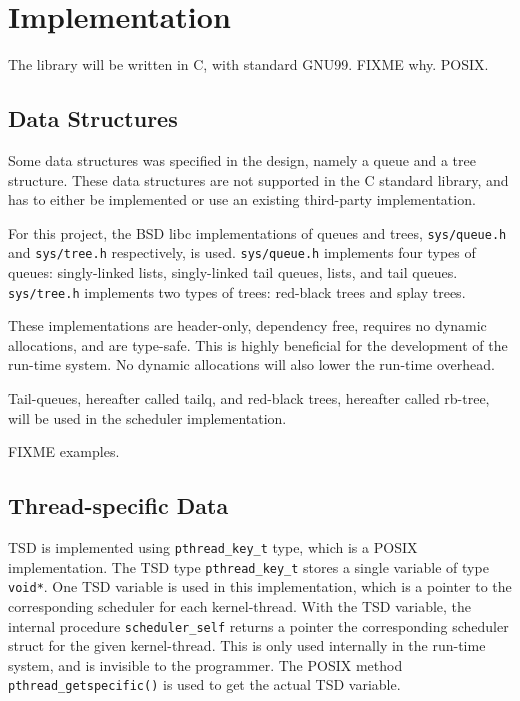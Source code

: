 
\chapter{Implementation}
\label{ch:implementation}

The library will be written in C, with standard GNU99. FIXME why. POSIX.


\section{Data Structures}

Some data structures was specified in the design, namely a queue and a tree structure. These data structures are not supported in the C standard library, and has to either be implemented or use an existing third\hyp{}party implementation.

For this project, the BSD libc implementations of queues and trees, \texttt{sys/queue.h} \citep{manqueue} and \texttt{sys/tree.h} \citep{mantree} respectively, is used. \texttt{sys/queue.h} implements four types of queues: singly\hyp{}linked lists, singly\hyp{}linked tail queues, lists, and tail queues. \texttt{sys/tree.h} implements two types of trees: red\hyp{}black trees and splay trees. 

These implementations are header\hyp{}only, dependency free, requires no dynamic allocations, and are type\hyp{}safe. This is highly beneficial for the development of the run\hyp{}time system. No dynamic allocations will also lower the run\hyp{}time overhead. 

Tail\hyp{}queues, hereafter called tailq, and red\hyp{}black trees, hereafter called rb\hyp{}tree, will be used in the scheduler implementation. 

FIXME examples.


\section{Thread\hyp{}specific Data}

TSD is implemented using \texttt{pthread\_key\_t} type, which is a POSIX implementation. The TSD type \texttt{pthread\_key\_t} stores a single variable of type \texttt{void*}. One TSD variable is used in this implementation, which is a pointer to the corresponding scheduler for each kernel\hyp{}thread. With the TSD variable, the internal procedure \texttt{scheduler\_self} returns a pointer the corresponding scheduler struct for the given kernel\hyp{}thread. This is only used internally in the run\hyp{}time system, and is invisible to the programmer. The POSIX method \texttt{pthread\_getspecific()} is used to get the actual TSD variable.

